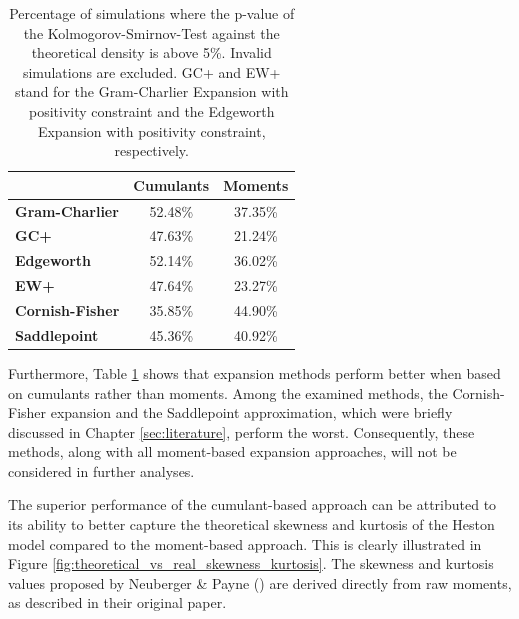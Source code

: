 \begin{table}[h]
    \centering
    \begin{tabular}{l|c|c}
        & \textbf{Cumulants} & \textbf{Moments} \\
        \hline
        \textbf{Gram-Charlier} & 52.48\% & 37.35\% \\
        \textbf{GC+}          & 47.63\% & 21.24\% \\
        \textbf{Edgeworth}     & 52.14\% & 36.02\% \\
        \textbf{EW+}          & 47.64\% & 23.27\% \\
        \textbf{Cornish-Fisher} & 35.85\% & 44.90\% \\
        \textbf{Saddlepoint}   & 45.36\% & 40.92\% \\
    \end{tabular}    
    \caption{Percentage of simulations where the p-value of the Kolmogorov-Smirnov-Test against the theoretical density is above 5\%. Invalid simulations are excluded. GC+ and EW+ stand for the Gram-Charlier Expansion with positivity constraint and the Edgeworth Expansion with positivity constraint, respectively.}
    \label{tab:KS_p_value_percentage}
\end{table}

Furthermore, Table \ref{tab:KS_p_value_percentage} shows that expansion methods perform better when based on cumulants rather than moments. Among the examined methods, the Cornish-Fisher expansion and the Saddlepoint approximation, which were briefly discussed in Chapter \ref{sec:literature}, perform the worst. Consequently, these methods, along with all moment-based expansion approaches, will not be considered in further analyses.

The superior performance of the cumulant-based approach can be attributed to its ability to better capture the theoretical skewness and kurtosis of the Heston model compared to the moment-based approach. This is clearly illustrated in Figure \ref{fig:theoretical_vs_real_skewness_kurtosis}. The skewness and kurtosis values proposed by Neuberger \& Payne (\citeyear{neubergerSkewnessStockMarket2021}) are derived directly from raw moments, as described in their original paper.

